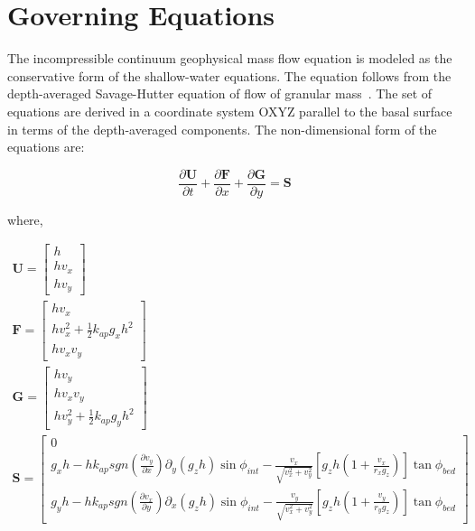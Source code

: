 \section{Governing Equations}
\label{governing}
The incompressible continuum geophysical mass flow equation is modeled as the conservative form of the shallow-water equations. The equation follows from the depth-averaged Savage-Hutter equation of flow of granular mass~\cite{savage1989motion}. The set of equations are derived in a coordinate system OXYZ parallel to the basal surface in terms of the depth-averaged components. The non-dimensional form of the equations are:

\begin{equation}
\label{main_eq}
\frac{\partial \textbf{U}}{\partial t} + \frac{\partial \textbf{F}}{\partial x} + \frac{\partial \textbf{G}}{\partial y} = \textbf{S}
\end{equation}

\noindent where, 

\begin{equation}
\label{defs}
\begin{array}{c}
\textbf{U} = \begin{bmatrix}
h \\ hv_x \\ hv_y
\end{bmatrix} \\
\textbf{F} = \begin{bmatrix}
hv_x \\ hv_x^2 + \frac{1}{2}k_{ap}g_x h^2  \\ h v_x v_y
\end{bmatrix} \\
\textbf{G} = \begin{bmatrix}
hv_y \\ hv_xv_y \\ hv_y^2 + \frac{1}{2}k_{ap}g_y h^2  
\end{bmatrix} \\
\textbf{S} = \begin{bmatrix}
0 \\
g_x h - h k_{ap} sgn \left( \frac{\partial v_y}{\partial x} \right) \partial_y \left( g_z h \right) \sin \phi_{int} - \frac{v_x}{ \sqrt{v_x^2 + v_y^2}} \left[ g_z h \left( 1+ \frac{v_x}{r_x g_z} \right) \right] \tan \phi_{bed} \\
g_y h - h k_{ap} sgn \left( \frac{\partial v_x}{\partial y} \right) \partial_x \left( g_z h \right) \sin \phi_{int} - \frac{v_y}{ \sqrt{v_x^2 + v_y^2}} \left[ g_z h \left( 1+ \frac{v_y}{r_y g_z} \right) \right] \tan \phi_{bed}
\end{bmatrix}
\end{array}
\end{equation}

